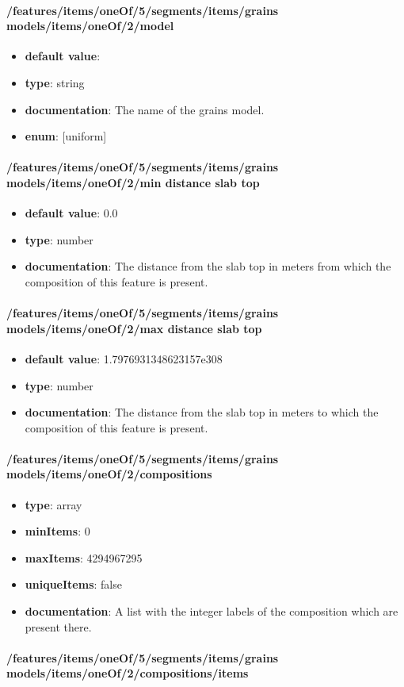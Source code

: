 \paragraph{/features/items/oneOf/5/segments/items/grains models/items/oneOf/2/model}
\begin{itemize}\item {\bf default value}: 
\item {\bf type}: string
\item {\bf documentation}: The name of the grains model.
\item {\bf enum}: [uniform]\end{itemize}\paragraph{/features/items/oneOf/5/segments/items/grains models/items/oneOf/2/min distance slab top}
\begin{itemize}\item {\bf default value}: 0.0
\item {\bf type}: number
\item {\bf documentation}: The distance from the slab top in meters from which the composition of this feature is present.
\end{itemize}\paragraph{/features/items/oneOf/5/segments/items/grains models/items/oneOf/2/max distance slab top}
\begin{itemize}\item {\bf default value}: 1.7976931348623157e308
\item {\bf type}: number
\item {\bf documentation}: The distance from the slab top in meters to which the composition of this feature is present.
\end{itemize}\paragraph{/features/items/oneOf/5/segments/items/grains models/items/oneOf/2/compositions}
\begin{itemize}\item {\bf type}: array
\item {\bf minItems}: 0
\item {\bf maxItems}: 4294967295
\item {\bf uniqueItems}: false
\item {\bf documentation}: A list with the integer labels of the composition which are present there.
\end{itemize}\paragraph{/features/items/oneOf/5/segments/items/grains models/items/oneOf/2/compositions/items}
